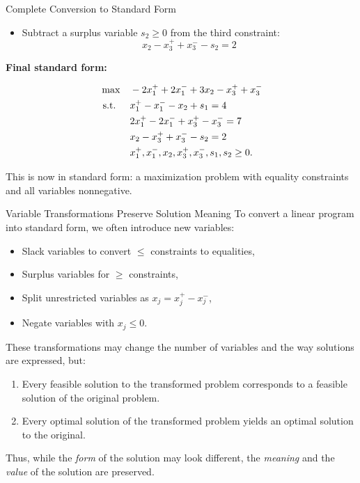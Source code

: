 \begin{example}{Complete Conversion to Standard Form}
\begin{itemize}
    \item Subtract a surplus variable \( s_2 \geq 0 \) from the third constraint:
    \[
    x_2 - x_3^+ + x_3^- - s_2 = 2
    \]
\end{itemize}

\medskip
\textbf{Final standard form:}

\[
\begin{aligned}
\max \quad & -2x_1^+ + 2x_1^- + 3x_2 - x_3^+ + x_3^- \\
\text{ s.t. } \quad 
& x_1^+ - x_1^- - x_2 + s_1 = 4 \\
& 2x_1^+ - 2x_1^- + x_3^+ - x_3^- = 7 \\
& x_2 - x_3^+ + x_3^- - s_2 = 2 \\
& x_1^+, x_1^-, x_2, x_3^+, x_3^-, s_1, s_2 \geq 0.
\end{aligned}
\]

This is now in standard form: a maximization problem with equality constraints and all variables nonnegative.
\end{example}

\begin{remark}{Variable Transformations Preserve Solution Meaning}{}
To convert a linear program into standard form, we often introduce new variables:
\begin{itemize}
    \item Slack variables to convert \( \leq \) constraints to equalities,
    \item Surplus variables for \( \geq \) constraints,
    \item Split unrestricted variables as \( x_j = x_j^+ - x_j^- \),
    \item Negate variables with \( x_j \leq 0 \).
\end{itemize}

These transformations may change the number of variables and the way solutions are expressed, but:
\begin{enumerate}
    \item Every feasible solution to the transformed problem corresponds to a feasible solution of the original problem.
    \item Every optimal solution of the transformed problem yields an optimal solution to the original.
\end{enumerate}

Thus, while the \emph{form} of the solution may look different, the \emph{meaning} and the \emph{value} of the solution are preserved.
\end{remark}

